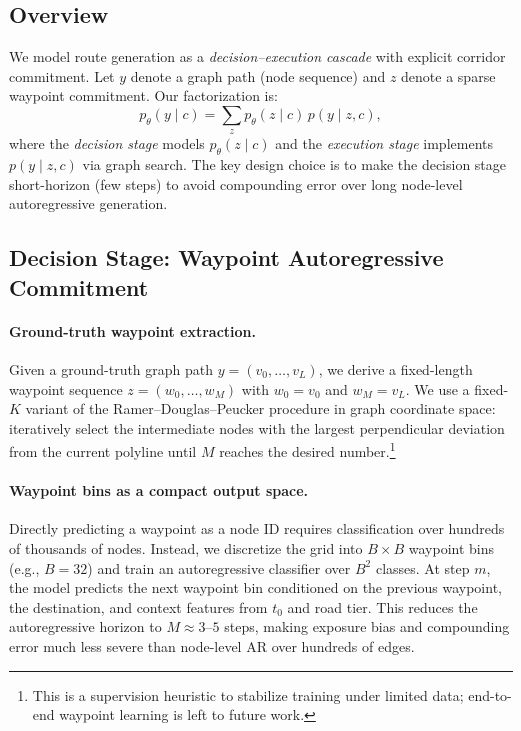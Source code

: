 
\subsection{Overview}

We model route generation as a \emph{decision--execution cascade} with explicit corridor commitment.
Let $y$ denote a graph path (node sequence) and $z$ denote a sparse waypoint commitment.
Our factorization is:
\begin{equation}
  p_\theta(y \mid c) = \sum_{z} p_\theta(z \mid c)\, p(y \mid z, c),
\end{equation}
where the \emph{decision stage} models $p_\theta(z \mid c)$ and the \emph{execution stage} implements $p(y \mid z, c)$ via graph search.
The key design choice is to make the decision stage short-horizon (few steps) to avoid compounding error over long node-level autoregressive generation.

\subsection{Decision Stage: Waypoint Autoregressive Commitment}

\paragraph{Ground-truth waypoint extraction.}
Given a ground-truth graph path $y=(v_0,\dots,v_L)$, we derive a fixed-length waypoint sequence $z=(w_0,\dots,w_M)$ with $w_0=v_0$ and $w_M=v_L$.
We use a fixed-$K$ variant of the Ramer--Douglas--Peucker procedure in graph coordinate space: iteratively select the intermediate nodes with the largest perpendicular deviation from the current polyline until $M$ reaches the desired number.\footnote{This is a supervision heuristic to stabilize training under limited data; end-to-end waypoint learning is left to future work.}

\paragraph{Waypoint bins as a compact output space.}
Directly predicting a waypoint as a node ID requires classification over hundreds of thousands of nodes.
Instead, we discretize the grid into $B\times B$ waypoint bins (e.g., $B=32$) and train an autoregressive classifier over $B^2$ classes.
At step $m$, the model predicts the next waypoint bin conditioned on the previous waypoint, the destination, and context features from $t_0$ and road tier.
This reduces the autoregressive horizon to $M\!\approx\!3$--$5$ steps, making exposure bias and compounding error much less severe than node-level AR over hundreds of edges.

